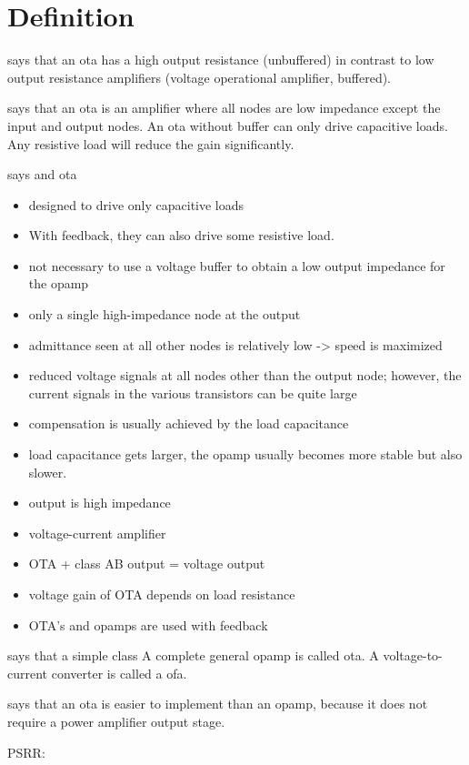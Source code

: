 \documentclass{article}[11pt]
\begin{document}
\section{Definition}

\cite[p. 261]{allen-cmosancirdes-12} says that an \gls{ota} has a high output 
resistance (unbuffered) in contrast to low output resistance amplifiers 
(voltage operational amplifier, buffered).

\medskip

\cite[section 24.3]{baker-cmoscircdesnsim-10} says that an \gls{ota} is an amplifier 
where all nodes are low impedance except the input and output nodes.
An \gls{ota} without buffer can only drive capacitive loads.
Any resistive load will reduce the gain significantly.

\medskip

\cite[section 6.4]{johnsmartin-aicd-12} says and \gls{ota}
\begin{itemize}
  \item designed to drive only capacitive loads
  \item With feedback, they can also drive some resistive load.
  \item not necessary to use a voltage buffer to obtain a low output impedance for the opamp
  \item only a single high-impedance node at the output
  \item admittance seen at all other nodes is relatively low -> speed is maximized
  \item reduced voltage signals at all nodes other than the output node; however, the current signals in the various transistors can be quite large
  \item compensation is usually achieved by the load capacitance
  \item load capacitance gets larger, the opamp usually becomes more stable but also slower.
\end{itemize}

\medskip

\cite[055 ff.]{sansen-anadesess-06}
\begin{itemize}
  \item output is high impedance
  \item voltage-current amplifier
  \item OTA + class AB output = voltage output
  \item voltage gain of OTA depends on load resistance
  \item OTA's and opamps are used with feedback
\end{itemize}

\medskip

\cite{huijsing-opamp-17} says that a simple class A complete general opamp
is called \gls{ota}.
A voltage-to-current converter is called a \gls{ofa}.

\medskip

\cite[subsection 10.5.4]{wicht-pmic-24} says that an \gls{ota} is easier to implement 
than an opamp, because it does not require a power amplifier output stage.

\medskip

PSRR: \cite{steyaert-psrrota-90}

\printbibliography
\end{document}
